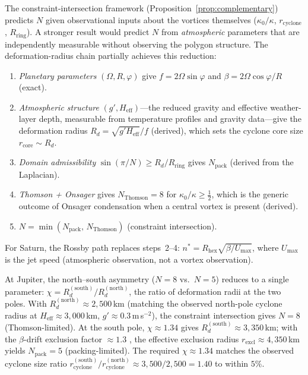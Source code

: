 The constraint-intersection framework
(Proposition~\ref{prop:complementary}) predicts $N$ given
observational inputs about the vortices themselves ($\kappa_0/\kappa$,
$r_{\mathrm{cyclone}}$, $R_{\mathrm{ring}}$).  A stronger result
would predict $N$ from \emph{atmospheric} parameters that are
independently measurable without observing the polygon structure.
The deformation-radius chain partially achieves this reduction:
\begin{enumerate}
  \item \emph{Planetary parameters} $(\Omega, R, \varphi)$ give
    $f = 2\Omega\sin\varphi$ and
    $\beta = 2\Omega\cos\varphi / R$ (exact).
  \item \emph{Atmospheric structure} $(g', H_{\mathrm{eff}})$---the
    reduced gravity and effective weather-layer depth, measurable from
    temperature profiles and gravity data---give the deformation
    radius $R_d = \sqrt{g' H_{\mathrm{eff}}}/f$ (derived), which
    sets the cyclone core size $r_{\mathrm{core}} \sim R_d$.
  \item \emph{Domain admissibility}
    $\sin(\pi/N) \ge R_d / R_{\mathrm{ring}}$ gives
    $N_{\mathrm{pack}}$ (derived from the Laplacian).
  \item \emph{Thomson + Onsager} gives $N_{\mathrm{Thomson}} = 8$
    for $\kappa_0/\kappa \ge \tfrac{1}{2}$, which is the
    generic outcome of Onsager condensation when a central vortex
    is present (derived).
  \item $N = \min(N_{\mathrm{pack}},\, N_{\mathrm{Thomson}})$
    (constraint intersection).
\end{enumerate}
For Saturn, the Rossby path replaces steps~2--4:
$n^* = R_{\mathrm{hex}}\sqrt{\beta/U_{\max}}$, where
$U_{\max}$ is the jet speed (atmospheric observation, not a
vortex observation).

At Jupiter, the north--south asymmetry ($N = 8$ vs.\ $N = 5$) reduces
to a single parameter: $\chi = R_d^{(\mathrm{south})}/R_d^{(\mathrm{north})}$,
the ratio of deformation radii at the two poles.  With
$R_d^{(\mathrm{north})} \approx 2{,}500$\,km (matching the observed
north-pole cyclone radius at $H_{\mathrm{eff}} \approx 3{,}000$\,km,
$g' \approx 0.3$\,m\,s$^{-2}$), the constraint intersection gives
$N = 8$ (Thomson-limited).  At the south pole,
$\chi \approx 1.34$ gives $R_d^{(\mathrm{south})} \approx 3{,}350$\,km;
with the $\beta$-drift exclusion factor $\approx 1.3$
\citep{Gavriel2021}, the effective exclusion radius
$r_{\mathrm{excl}} \approx 4{,}350$\,km yields
$N_{\mathrm{pack}} = 5$ (packing-limited).  The required
$\chi \approx 1.34$ matches the observed cyclone size ratio
$r_{\mathrm{cyclone}}^{(\mathrm{south})}/r_{\mathrm{cyclone}}^{(\mathrm{north})}
\approx 3{,}500/2{,}500 = 1.40$ to within $5\%$.

